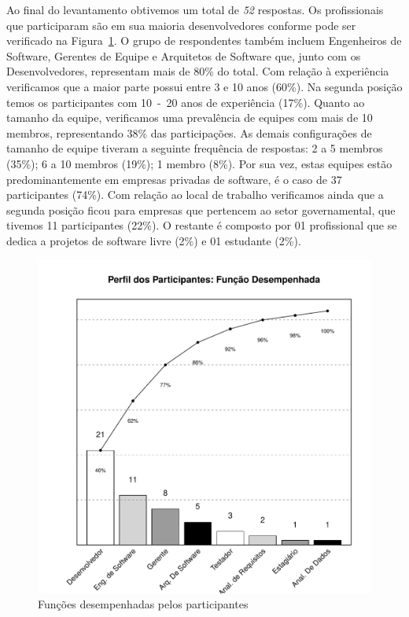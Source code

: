 Ao final do levantamento obtivemos um total de \textit{52} respostas. Os
profissionais que participaram são em sua maioria desenvolvedores conforme pode
ser verificado na
Figura~\ref{fig:grafico_escolha_ferramentas_funcao_participantes}. O grupo de
respondentes também incluem Engenheiros de Software, Gerentes de Equipe e
Arquitetos de Software que, junto com os Desenvolvedores, representam mais de
80\% do total. Com relação à experiência verificamos que a maior parte possui
entre 3 e 10 anos (60\%). Na segunda posição temos os participantes com 10~-~20
anos de experiência (17\%). Quanto ao tamanho da equipe, verificamos uma
prevalência de equipes com mais de 10 membros, representando 38\% das
participações. As demais configurações de tamanho de equipe tiveram a seguinte
frequência de respostas: 2 a 5 membros (35\%); 6 a 10 membros (19\%); 1 membro
(8\%). Por sua vez, estas equipes estão predominantemente em empresas privadas
de software, é o caso de 37 participantes (74\%). Com relação ao local de
trabalho verificamos ainda que a segunda posição ficou para empresas que
pertencem ao setor governamental, que tivemos 11 participantes (22\%). O
restante é composto por 01 profissional que se dedica a projetos de software
livre (2\%) e 01 estudante (2\%).

\begin{figure}[htpb]
	\centering
	\includegraphics[width=0.7\linewidth]{./chapter-estudo-funcionalidades-fgrm/img/grafico_escolha_ferramentas_funcao_participantes.pdf}
	\caption{Funções desempenhadas pelos participantes}
\label{fig:grafico_escolha_ferramentas_funcao_participantes}
\end{figure}


